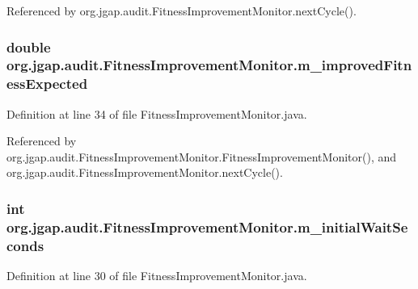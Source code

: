 Referenced by org.\-jgap.\-audit.\-Fitness\-Improvement\-Monitor.\-next\-Cycle().

\hypertarget{classorg_1_1jgap_1_1audit_1_1_fitness_improvement_monitor_a80dc25a60d6f8c8838da7a1115940efe}{
\subsubsection[{m\-\_\-improved\-Fitness\-Expected}]{\setlength{\rightskip}{0pt plus 5cm}double org.\-jgap.\-audit.\-Fitness\-Improvement\-Monitor.\-m\-\_\-improved\-Fitness\-Expected\hspace{0.3cm}{\ttfamily [private]}}}\label{classorg_1_1jgap_1_1audit_1_1_fitness_improvement_monitor_a80dc25a60d6f8c8838da7a1115940efe}


Definition at line 34 of file Fitness\-Improvement\-Monitor.\-java.



Referenced by org.\-jgap.\-audit.\-Fitness\-Improvement\-Monitor.\-Fitness\-Improvement\-Monitor(), and org.\-jgap.\-audit.\-Fitness\-Improvement\-Monitor.\-next\-Cycle().

\hypertarget{classorg_1_1jgap_1_1audit_1_1_fitness_improvement_monitor_a0cf4e59761f691dcd738a93fbd4f636c}{
\subsubsection[{m\-\_\-initial\-Wait\-Seconds}]{\setlength{\rightskip}{0pt plus 5cm}int org.\-jgap.\-audit.\-Fitness\-Improvement\-Monitor.\-m\-\_\-initial\-Wait\-Seconds\hspace{0.3cm}{\ttfamily [private]}}}\label{classorg_1_1jgap_1_1audit_1_1_fitness_improvement_monitor_a0cf4e59761f691dcd738a93fbd4f636c}


Definition at line 30 of file Fitness\-Improvement\-Monitor.\-java.



